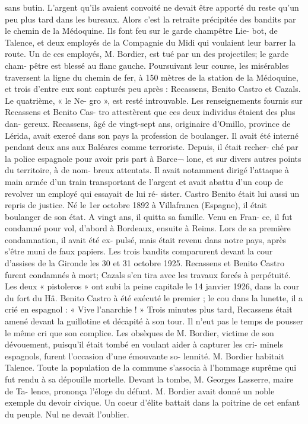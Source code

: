 \documentclass[a4paper,11pt]{book}
\begin{document}
sans butin. L'argent qu'ils avaient convoité ne devait
être apporté du reste qu'un peu plus tard dans les bureaux.
Alors c'est la retraite précipitée des bandits par le chemin
de la Médoquine. Ils font feu sur le garde champêtre Lie-
bot, de Talence, et deux employés de la Compagnie du
Midi qui voulaient leur barrer la route. Un de ces employés,
M. Bordier, est tué par un des projectiles; le garde cham-
pêtre est blessé au flanc gauche.
Poursuivant leur course, les misérables traversent la
ligne du chemin de fer, à 150 mètres de la station de la
Médoquine, et trois d'entre eux sont capturés peu après :
Recassens, Benito Castro et Cazals. Le quatrième, « le Ne-
gro », est resté introuvable.
Les renseignements fournis sur Recassens et Benito Cas-
tro attestèrent que ces deux individus étaient des plus dan-
gereux. Recassens, âgé de vingt-sept ans, originaire
d'Omillo, province de Lérida, avait exercé dans son pays
la profession de boulanger. Il avait été interné pendant deux
ans aux Baléares comme terroriste. Depuis, il était recher-
ché par la police espagnole pour avoir pris part à Barce¬
lone, et sur divers autres points du territoire, à de nom-
breux attentats. Il avait notamment dirigé l'attaque à main
armée d'un train transportant de l'argent et avait abattu
d'un coup de revolver un employé qui essayait de lui ré-
sister.
Castro Benito était lui aussi un repris de justice. Né le
1er octobre 1892 à Villafranca (Espagne), il était boulanger
de son état. A vingt ans, il quitta sa famille. Venu en Fran-
ce, il fut condamné pour vol, d'abord à Bordeaux, ensuite à
Reims. Lors de sa première condamnation, il avait été ex-
pulsé, mais était revenu dans notre pays, après s'être
muni de faux papiers.
Les trois bandits comparurent devant la cour d'assises
de la Gironde les 30 et 31 octobre 1925. Recassens et Benito
Castro furent condamnés à mort; Cazals s'en tira avec les
travaux forcés à perpétuité.
Les deux « pistoleros » ont subi la peine capitale le
14 janvier 1926, dans la cour du fort du Hâ. Benito Castro
à été exécuté le premier ; le cou dans la lunette, il a crié en
espagnol : « Vive l'anarchie ! » Trois minutes plus tard,
Recassens était amené devant la guillotine et décapité à son
tour. Il n'eut pas le temps de pousser le même cri que son
complice.
Les obsèques de M. Bordier, victime de son dévouement,
puisqu'il était tombé en voulant aider à capturer les cri-
minels espagnols, furent l'occasion d'une émouvante so-
lennité. M. Bordier habitait Talence. Toute la population de
la commune s'associa à l'hommage suprême qui fut rendu
à sa dépouille mortelle.
Devant la tombe, M. Georges Lasserre, maire de Ta-
lence, prononça l'éloge du défunt. M. Bordier avait donné
un noble exemple du devoir civique. Un coeur d'élite battait
dans la poitrine de cet enfant du peuple. Nul ne devait
l'oublier.
\end{document}

